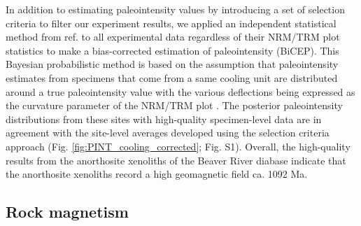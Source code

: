 \documentclass[9pt,twocolumn,twoside,lineno]{pnas-new}
\begin{document}
In addition to estimating paleointensity values by introducing a set of selection criteria to filter our experiment results, we applied an independent statistical method from ref. \citealp{Cych2021a} to all experimental data regardless of their NRM/TRM plot statistics to make a bias-corrected estimation of paleointensity (BiCEP). This Bayesian probabilistic method is based on the assumption that paleointensity estimates from specimens that come from a same cooling unit are distributed around a true paleointensity value with the various deflections being expressed as the curvature parameter of the NRM/TRM plot \cite{Paterson2011a}. The posterior paleointensity distributions from these sites with high-quality specimen-level data are in agreement with the site-level averages developed using the selection criteria approach (Fig. \ref{fig:PINT_cooling_corrected}; Fig. S1). Overall, the high-quality results from the anorthosite xenoliths of the Beaver River diabase indicate that the anorthosite xenoliths record a high geomagnetic field ca. 1092 Ma. 

\subsection*{Rock magnetism}
\end{document}
